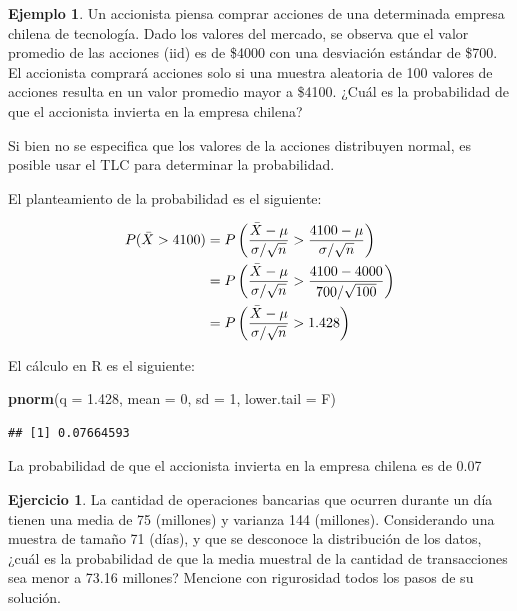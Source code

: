 \documentclass[
  11pt,
]{book}
\newenvironment{Shaded}{\begin{snugshade}}{\end{snugshade}}
\newcommand{\AttributeTok}[1]{\textcolor[rgb]{0.13,0.29,0.53}{#1}}
\newcommand{\DecValTok}[1]{\textcolor[rgb]{0.00,0.00,0.81}{#1}}
\newcommand{\FloatTok}[1]{\textcolor[rgb]{0.00,0.00,0.81}{#1}}
\newcommand{\FunctionTok}[1]{\textcolor[rgb]{0.13,0.29,0.53}{\textbf{#1}}}
\newcommand{\NormalTok}[1]{#1}
\theoremstyle{definition}
\theoremstyle{definition}
\newtheorem{example}{Ejemplo}[chapter]
\theoremstyle{definition}
\newtheorem{exercise}{Ejercicio}[chapter]
\theoremstyle{definition}
\theoremstyle{remark}
\begin{document}
\begin{example}
Un accionista piensa comprar acciones de una determinada empresa chilena de tecnología. Dado los valores del mercado, se observa que el valor promedio de las acciones (iid) es de \$4000 con una desviación estándar de \$700. El accionista comprará acciones solo si una muestra aleatoria de 100 valores de acciones resulta en un valor promedio mayor a \$4100. ¿Cuál es la probabilidad de que el accionista invierta en la empresa chilena?

Si bien no se especifica que los valores de la acciones distribuyen normal, es posible usar el TLC para determinar la probabilidad.

El planteamiento de la probabilidad es el siguiente:

\begin{equation}
\notag
\begin{split}
P(\bar{X} > 4100) &= P\left(\frac{\bar{X}-\mu}{\sigma/\sqrt{n}} > \frac{4100-\mu}{\sigma/\sqrt{n}}\right)\\
&= P\left(\frac{\bar{X}-\mu}{\sigma/\sqrt{n}} > \frac{4100 - 4000}{700/\sqrt{100}}\right)\\
&= P\left(\frac{\bar{X}-\mu}{\sigma/\sqrt{n}} > 1.428\right)\\
\end{split}
\end{equation}

El cálculo en R es el siguiente:

\begin{Shaded}
\begin{Highlighting}[]
\FunctionTok{pnorm}\NormalTok{(}\AttributeTok{q =} \FloatTok{1.428}\NormalTok{, }\AttributeTok{mean =} \DecValTok{0}\NormalTok{, }\AttributeTok{sd =} \DecValTok{1}\NormalTok{, }\AttributeTok{lower.tail =}\NormalTok{ F)}
\end{Highlighting}
\end{Shaded}

\begin{verbatim}
## [1] 0.07664593
\end{verbatim}

La probabilidad de que el accionista invierta en la empresa chilena es de 0.07
\end{example}

\begin{exercise}
La cantidad de operaciones bancarias que ocurren durante un día tienen una media de 75 (millones) y varianza 144 (millones). Considerando una muestra de tamaño 71 (días), y que se desconoce la distribución de los datos, ¿cuál es la probabilidad de que la media muestral de la cantidad de transacciones sea menor a 73.16 millones? Mencione con rigurosidad todos los pasos de su solución.
\end{exercise}
\end{document}
